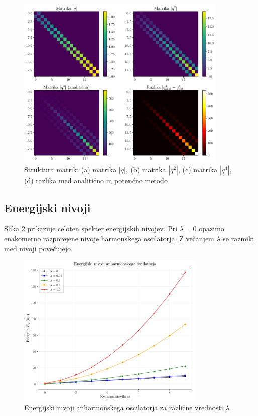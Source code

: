\documentclass[12pt,a4paper]{article}
\begin{document}
\begin{figure}[hb]
    \centering
    \includegraphics[width=0.9\textwidth]{anharmonic_oscillator_plots/07_struktura_matrik.pdf}
    \caption{Struktura matrik: (a) matrika $|q|$, (b) matrika $|q^2|$, (c) matrika $|q^4|$, (d) razlika med analitično in potenčno metodo}
    \label{fig:struktura_matrik}
\end{figure}

\newpage

\subsection{Energijski nivoji}

Slika \ref{fig:energijski_nivoji} prikazuje celoten spekter energijskih nivojev. 
Pri $\lambda = 0$ opazimo enakomerno razporejene nivoje harmonskega oscilatorja. 
Z večanjem $\lambda$ se razmiki med nivoji povečujejo.

\begin{figure}[hb]
    \centering
    \includegraphics[width=0.8\textwidth]{anharmonic_oscillator_plots/06_energijski_nivoji.pdf}
    \caption{Energijski nivoji anharmonskega oscilatorja za različne vrednosti $\lambda$}
    \label{fig:energijski_nivoji}
\end{figure}
\end{document}
